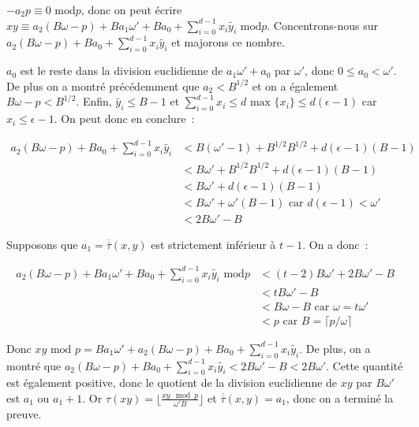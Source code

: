     $-a_2 p \equiv 0 \text{\ mod} p$, donc on peut écrire $xy \equiv a_2(B\omega - p) + B a_1\omega' + B a_0 + \sum_{i=0}^{d-1} x_i \tilde{y_i} \text{\ mod} p$. Concentrons-nous sur $a_2(B\omega - p) + B a_0 + \sum_{i=0}^{d-1} x_i \tilde{y_i}$ et majorons ce nombre.

    $a_0$ est le reste dans la division euclidienne de $a_1\omega' + a_0$ par $\omega'$, donc $0 \leq a_0 < \omega'$. De plus on a montré précédemment que $a_2 < B^{1/2}$ et on a également $B\omega - p < B^{1/2}$. Enfin, $\tilde{y_i} \leq B - 1$ et $\sum_{i=0}^{d-1} x_i \leq d \text{\ max $\{x_i\}$} \leq d(\epsilon - 1)$ car $x_i \leq \epsilon - 1$. On peut donc en conclure~:

    \begin{align*}
    a_2(B\omega - p) + B a_0 + \sum_{i=0}^{d-1} x_i \tilde{y_i} &< B(\omega' - 1) + B^{1/2}B^{1/2} + d(\epsilon - 1)(B - 1) \\
                            &< B\omega' + B^{1/2}B^{1/2} + d(\epsilon - 1)(B - 1) \\
                            &< B\omega' + d(\epsilon - 1)(B - 1) \\
                            &< B\omega' + \omega'(B - 1) \text{\ car $d(\epsilon - 1) < \omega'$} \\
                            &< 2B\omega' - B
    \end{align*}

    Supposons que $a_1 = \overline{\overline{\tau}}(x,y)$ est strictement inférieur à $t - 1$. On a donc~:

    \begin{align*}
    a_2(B\omega - p) + B a_1\omega' + B a_0 + \sum_{i=0}^{d-1} x_i \tilde{y_i} \text{\ mod} p &< (t - 2)B\omega' + 2B\omega' - B \\
                          &< tB\omega' - B \\
                          &< B\omega - B \text{\ car $\omega = t\omega'$} \\
                          &< p \text{\ car $B = \lceil p/\omega \rceil$}
    \end{align*}

    Donc $xy \text{\ mod } p = B a_1\omega' + a_2(B\omega - p) + B a_0 + \sum_{i=0}^{d-1} x_i \tilde{y_i}$. De plus, on a montré que $a_2(B\omega - p) + B a_0 + \sum_{i=0}^{d-1} x_i \tilde{y_i} < 2B\omega' - B < 2B\omega'$. Cette quantité est également positive, donc le quotient de la division euclidienne de $xy$ par $B\omega'$ est $a_1$ ou $a_1 + 1$. Or $\tau(xy) = \lfloor \frac{xy\mod p}{\omega' B} \rfloor$ et $\overline{\overline{\tau}}(x,y) = a_1$, donc on a terminé la preuve.

